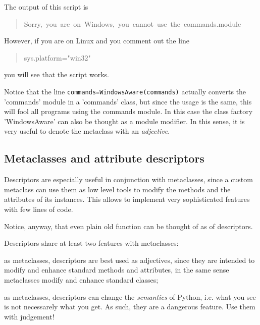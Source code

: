 \documentclass[10pt,english]{article}
\begin{document}
The output of this script is
\begin{quote}
\begin{ttfamily}\begin{flushleft}
\mbox{Sorry,~you~are~on~Windows,~you~cannot~use~the~commands.module}
\end{flushleft}\end{ttfamily}
\end{quote}

However, if you are on Linux and you comment out the line
\begin{quote}
\begin{ttfamily}\begin{flushleft}
\mbox{sys.platform="win32"~}
\end{flushleft}\end{ttfamily}
\end{quote}

you will see that the script works.

Notice that the line \texttt{commands=WindowsAware(commands)} actually
converts the 'commands' module in a 'commands' class, but since
the usage is the same, this will fool all programs using the
commands module. In this case the class factory 'WindowsAware'
can also be thought as a module modifier. In this sense, it is
very useful to denote the metaclass with an \emph{adjective}.



\hypertarget{metaclasses-and-attribute-descriptors}{}
\subsection*{Metaclasses and attribute descriptors}

Descriptors are especially useful in conjunction with metaclasses, since
a custom metaclass can use them as low level tools to modify the methods 
and the attributes of its instances. This allows to implement very 
sophisticated features with few lines of code.

Notice, anyway, that
even plain old function can be thought of as of descriptors.

Descriptors share at least two features with metaclasses:
\begin{list}{.}
{
\setlength{\rightmargin}{\leftmargin}
}
\item {} 
as metaclasses, descriptors are best used as adjectives, since they
are intended to modify and enhance standard methods and attributes, in the
same sense metaclasses modify and enhance standard classes;

\item {} 
as metaclasses, descriptors can change the \emph{semantics} of Python, i.e.
what you see is not necessarely what you get. As such, they are a 
dangerous feature. Use them with judgement!

\end{list}
\end{document}
